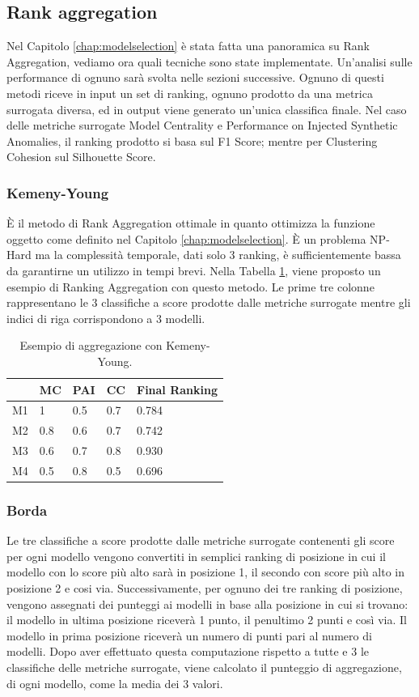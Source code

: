 \subsection{Rank aggregation}
Nel Capitolo \ref{chap:modelselection} è stata fatta una panoramica su Rank Aggregation, vediamo ora quali tecniche sono state implementate. Un'analisi sulle performance di ognuno sarà svolta nelle sezioni successive.
Ognuno di questi metodi riceve in input un set di ranking, ognuno prodotto da una metrica surrogata diversa, ed in output viene generato un'unica classifica finale.
Nel caso delle metriche surrogate Model Centrality e Performance on Injected Synthetic Anomalies, il ranking prodotto si basa sul F1 Score; mentre per Clustering Cohesion sul Silhouette Score.
\subsubsection{Kemeny-Young}
È il metodo di Rank Aggregation ottimale in quanto ottimizza la funzione oggetto come definito nel Capitolo \ref{chap:modelselection}. È un problema NP-Hard ma la complessità temporale, dati solo 3 ranking, è sufficientemente bassa da garantirne un utilizzo in tempi brevi. Nella Tabella \ref{kemeny-young}, viene proposto un esempio di Ranking Aggregation con questo metodo. Le prime tre colonne rappresentano le 3 classifiche a score prodotte dalle metriche surrogate mentre gli indici di riga corrispondono a 3 modelli.
\begin{table}
	\centering
	\caption{\label{kemeny-young}Esempio di aggregazione con Kemeny-Young.}
	\begin{tabular}{|l|l|l|l|l|} 
		\hline
		   & MC  & PAI & CC  & Final Ranking \\ 
		\hline
		M1 & 1   & 0.5 & 0.7 & 0.784         \\ 
		\hline
		M2 & 0.8 & 0.6 & 0.7 & 0.742         \\ 
		\hline
		M3 & 0.6 & 0.7 & 0.8 & 0.930         \\ 
		\hline
		M4 & 0.5 & 0.8 & 0.5 & 0.696         \\
		\hline
	\end{tabular}
\end{table}

\subsubsection{Borda}
Le tre classifiche a score prodotte dalle metriche surrogate contenenti gli score per ogni modello vengono convertiti in semplici ranking di posizione in cui il modello con lo score più alto sarà in posizione 1, il secondo con score più alto in posizione 2 e cosi via. 
Successivamente, per ognuno dei tre ranking di posizione, vengono assegnati dei punteggi ai modelli in base alla posizione in cui si trovano: il modello in ultima posizione riceverà 1 punto, il penultimo 2 punti e così via. Il modello in prima posizione riceverà un numero di punti pari al numero di modelli. 
Dopo aver effettuato questa computazione rispetto a tutte e 3 le classifiche delle metriche surrogate, viene calcolato il punteggio di aggregazione, di ogni modello, come la media dei 3 valori.

